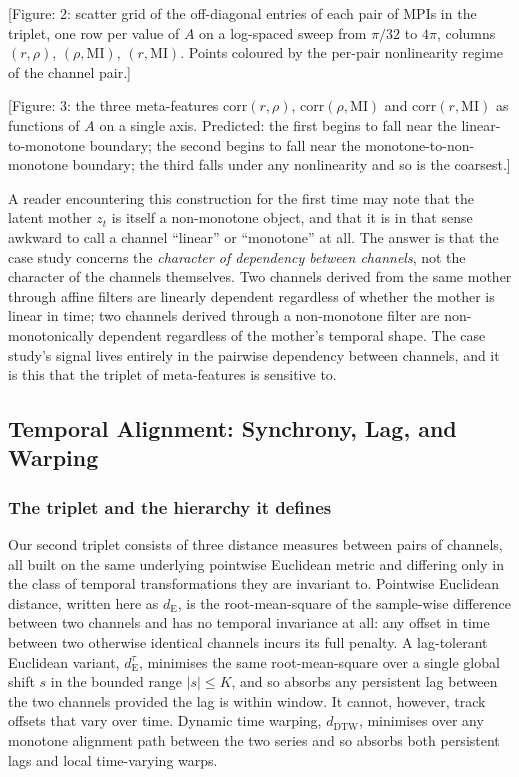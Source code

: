 \documentclass{article}
\theoremstyle{plain}
\theoremstyle{definition}
\theoremstyle{remark}
\newcommand{\figph}[1]{{\color{red}[Figure: #1]}}
\begin{document}
\figph{2: scatter grid of the off-diagonal entries of each pair of MPIs in the triplet, one row per value of $A$ on a log-spaced sweep from $\pi/32$ to $4\pi$, columns $(r,\rho)$, $(\rho,\mathrm{MI})$, $(r,\mathrm{MI})$. Points coloured by the per-pair nonlinearity regime of the channel pair.}

\figph{3: the three meta-features $\mathrm{corr}(r,\rho)$, $\mathrm{corr}(\rho,\mathrm{MI})$ and $\mathrm{corr}(r,\mathrm{MI})$ as functions of $A$ on a single axis. Predicted: the first begins to fall near the linear-to-monotone boundary; the second begins to fall near the monotone-to-non-monotone boundary; the third falls under any nonlinearity and so is the coarsest.}

A reader encountering this construction for the first time may note that the latent mother $z_t$ is itself a non-monotone object, and that it is in that sense awkward to call a channel ``linear'' or ``monotone'' at all. The answer is that the case study concerns the \emph{character of dependency between channels}, not the character of the channels themselves. Two channels derived from the same mother through affine filters are linearly dependent regardless of whether the mother is linear in time; two channels derived through a non-monotone filter are non-monotonically dependent regardless of the mother's temporal shape. The case study's signal lives entirely in the pairwise dependency between channels, and it is this that the triplet of meta-features is sensitive to.

\subsection{Temporal Alignment: Synchrony, Lag, and Warping}
\label{sec:case2}

\subsubsection{The triplet and the hierarchy it defines}

Our second triplet consists of three distance measures between pairs of channels, all built on the same underlying pointwise Euclidean metric and differing only in the class of temporal transformations they are invariant to. Pointwise Euclidean distance, written here as $d_{\mathrm{E}}$, is the root-mean-square of the sample-wise difference between two channels and has no temporal invariance at all: any offset in time between two otherwise identical channels incurs its full penalty. A lag-tolerant Euclidean variant, $d_{\mathrm{E}}^{\tau}$, minimises the same root-mean-square over a single global shift $s$ in the bounded range $|s|\leq K$, and so absorbs any persistent lag between the two channels provided the lag is within window. It cannot, however, track offsets that vary over time. Dynamic time warping, $d_{\mathrm{DTW}}$, minimises over any monotone alignment path between the two series and so absorbs both persistent lags and local time-varying warps.
\end{document}
